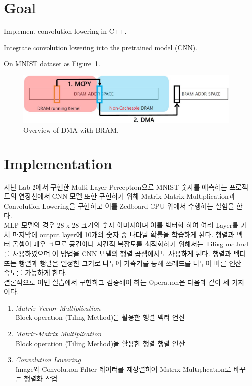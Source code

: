 \documentclass{article}
\begin{document}
\pagestyle{fancy}

\section*{Goal}

\begin{itemize*}
\item Implement convolution lowering in C++.
\item Integrate convolution lowering into the pretrained model (CNN).
\begin{itemize*}
\item On MNIST dataset as Figure~\ref{fig1}.
\end{itemize*}
\end{itemize*}
\begin{figure}[ht]
	\centering
	\includegraphics[width=1\textwidth]{fig/overview.jpg}
\caption{Overview of DMA with BRAM.}
\label{fig1}
\end{figure}

\section{Implementation}
지난 Lab 2에서 구현한 Multi-Layer Perceptron으로 MNIST 숫자를 예측하는 프로젝트의 연장선에서 CNN 모델 또한 구현하기 위해 Matrix-Matrix Multiplication과 Convolution Lowering을 구현하고 이를 Zedboard CPU 위에서 수행하는 실험을 한다. \\

MLP 모델의 경우 28 x 28 크기의 숫자 이미지이며 이를 벡터화 하여 여러 Layer를 거쳐 마지막에 output layer에 10개의 숫자 중 나타날 확률을 학습하게 된다. 행렬과 벡터 곱셈이 매우 크므로 공간이나 시간적 복잡도를 최적화하기 위해서는 Tiling method를 사용하였으며 이 방법을 CNN 모델의 행렬 곱셈에서도 사용하게 된다. 행렬과 벡터 또는 행렬과 행렬을 일정한 크기로 나누어 가속기를 통해 쓰레드를 나누어 빠른 연산 속도를 가능하게 한다. \\


결론적으로 이번 실습에서 구현하고 검증해야 하는 Operation은 다음과 같이 세 가지이다.
\begin{enumerate}
    \item \textit{Matrix-Vector Multiplication}\\
    Block operation (Tiling Method)을 활용한 행렬 벡터 연산
    \item \textit{Matrix-Matrix Multiplication}\\
    Block operation (Tiling Method)을 활용한 행렬 행렬 연산
    \item \textit{Convolution Lowering} \\
    Image와 Convolution Filter 데이터를 재정렬하여 Matrix Multiplication로 바꾸는 행렬화 작업~\cite{chellapilla2006high, chetlur2014cudnn}
\end{enumerate}
\end{document}
